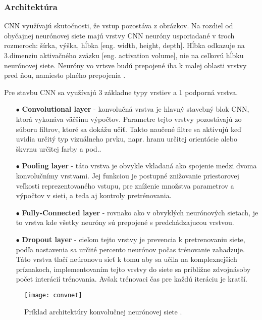 \subsubsection{Architektúra}
CNN využívajú skutočnosti, že vstup pozostáva z obrázkov.
Na rozdiel od obyčajnej neurónovej siete majú vrstvy CNN neuróny usporiadané v troch rozmeroch: šírka, výška, hĺbka [eng. width, height, depth].
Hĺbka odkazuje na 3.dimenziu aktivačného zväzku [eng. activation volume], nie na celkovú hĺbku neurónovej siete.
Neuróny vo vrtsve budú prepojené iba k malej oblasti vrstvy pred ňou, namiesto plného prepojenia \cite{odkaz:CNNArchitecture}.

Pre stavbu CNN sa využívajú 3 základne typy vrstiev a 1 podporná vrstva.
\begin{enumerate}
    \item[$\bullet$] \textbf{Convolutional layer} - konvolučná vrstva je hlavný stavebný blok CNN, ktorá vykonáva väčšinu výpočtov.
    Parametre tejto vrstvy pozostávajú zo súboru filtrov, ktoré sa dokážu učiť.
    Takto naučené filtre sa aktivujú keď uvidia určitý typ vizuálneho prvku, napr. hranu určitej orientácie alebo škvrnu určitej farby a pod..
    \item[$\bullet$] \textbf{Pooling layer} - táto vrstva je obvykle vkladaná ako spojenie medzi dvoma konvolučnímy vrstvami.
    Jej funkciou je postupné znižovanie priestorovej veľkosti reprezentovaného vstupu, pre zníženie množstva parametrov a výpočtov v sieti, a teda aj kontroly pretrénovania.
    \item[$\bullet$] \textbf{Fully-Connected layer} - rovnako ako v obvyklých neurónových sietach, je to vrstva kde všetky neuróny sú prepojené s predchádzajucou vrstvou.
    \item[$\bullet$] \textbf{Dropout layer} - cieľom tejto vrstvy je prevencia k pretrenovaniu siete, podľa nastavenia sa určité percento neurónov počas trénovanie zahadzuje.
    Táto vrstva tlačí neúronovu sieť k tomu aby sa učila na komplexnejších príznakoch, implementovaním tejto vrstvy do siete sa približne zdvojnásoby počet interácií trénovania.
    Avšak trénovaci čas pre každú iteráciu je kratší.
\end{enumerate}

\begin{figure}[H]
	\centering
	\texttt{[image: convnet]}
	\caption{Príklad architektúry konvolučnej neurónovej siete \cite{odkaz:CNNArchitecture}.}
	\label{pic:CNNExample}
\end{figure}

